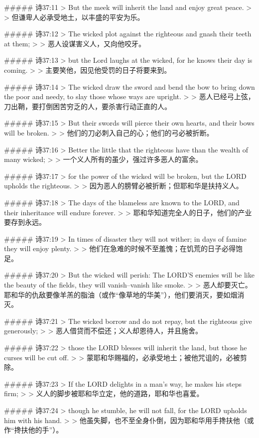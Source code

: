 ##### 诗37:11
> But the meek will inherit the land and enjoy great peace.
>
> 但谦卑人必承受地土，以丰盛的平安为乐。


##### 诗37:12
> The wicked plot against the righteous and gnash their teeth at them;
>
> 恶人设谋害义人，又向他咬牙。


##### 诗37:13
> but the Lord laughs at the wicked, for he knows their day is coming.
>
> 主要笑他，因见他受罚的日子将要来到。


##### 诗37:14
> The wicked draw the sword and bend the bow to bring down the poor and needy, to slay those whose ways are upright.
>
> 恶人已经弓上弦，刀出鞘，要打倒困苦穷乏的人，要杀害行动正直的人。


##### 诗37:15
> But their swords will pierce their own hearts, and their bows will be broken.
>
> 他们的刀必刺入自己的心；他们的弓必被折断。


##### 诗37:16
> Better the little that the righteous have than the wealth of many wicked;
>
> 一个义人所有的虽少，强过许多恶人的富余。


##### 诗37:17
> for the power of the wicked will be broken, but the LORD upholds the righteous.
>
> 因为恶人的膀臂必被折断；但耶和华是扶持义人。


##### 诗37:18
> The days of the blameless are known to the LORD, and their inheritance will endure forever.
>
> 耶和华知道完全人的日子，他们的产业要存到永远。


##### 诗37:19
> In times of disaster they will not wither; in days of famine they will enjoy plenty.
>
> 他们在急难的时候不至羞愧；在饥荒的日子必得饱足。


##### 诗37:20
> But the wicked will perish: The LORD'S enemies will be like the beauty of the fields, they will vanish--vanish like smoke.
>
> 恶人却要灭亡。耶和华的仇敌要像羊羔的脂油（或作“像草地的华美”），他们要消灭，要如烟消灭。


##### 诗37:21
> The wicked borrow and do not repay, but the righteous give generously;
>
> 恶人借贷而不偿还；义人却恩待人，并且施舍。


##### 诗37:22
> those the LORD blesses will inherit the land, but those he curses will be cut off.
>
> 蒙耶和华赐福的，必承受地土；被他咒诅的，必被剪除。


##### 诗37:23
> If the LORD delights in a man's way, he makes his steps firm;
>
> 义人的脚步被耶和华立定，他的道路，耶和华也喜爱。


##### 诗37:24
> though he stumble, he will not fall, for the LORD upholds him with his hand.
>
> 他虽失脚，也不至全身仆倒，因为耶和华用手搀扶他（或作“搀扶他的手”）。


